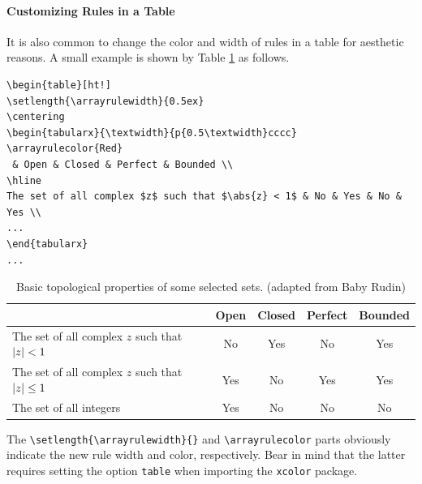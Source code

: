 \paragraph{Customizing Rules in a Table}
It is also common to change the color and width of rules in a table for aesthetic reasons. A small example is shown by Table \ref{tab:rudin} as follows.
\begin{lstlisting}
\begin{table}[ht!]
\setlength{\arrayrulewidth}{0.5ex}
\centering
\begin{tabularx}{\textwidth}{p{0.5\textwidth}cccc}
\arrayrulecolor{Red}
 & Open & Closed & Perfect & Bounded \\
\hline
The set of all complex $z$ such that $\abs{z} < 1$ & No & Yes & No & Yes \\
...
\end{tabularx}
...
\end{lstlisting}
\begin{table}[ht!]
\setlength{\arrayrulewidth}{0.5ex}
\centering
\begin{tabularx}{\textwidth}{p{}cccc}
\arrayrulecolor{Red}
 & Open & Closed & Perfect & Bounded \\
\hline
The set of all complex $z$ such that $\abs{z} < 1$ & No & Yes & No & Yes \\
The set of all complex $z$ such that $\abs{z} \leq 1$ & Yes & No & Yes & Yes \\
The set of all integers & Yes & No & No & No \\
\end{tabularx}
\caption{Basic topological properties of some selected sets. (adapted from Baby Rudin)}
\label{tab:rudin}
\end{table}
The \texttt{\textbackslash setlength\{\textbackslash arrayrulewidth\}\{\}} and \texttt{\textbackslash arrayrulecolor} parts obviously indicate the new rule width and color, respectively. Bear in mind that the latter requires setting the option \texttt{table} when importing the \texttt{xcolor} package.

